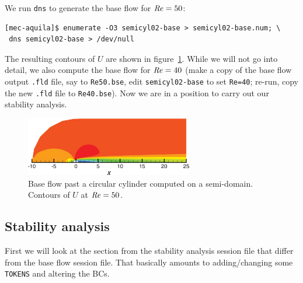 \documentclass[11pt,a4paper]{report}
\newcommand\Rey{\mbox{\textit{Re}}}
\begin{document}
We run \verb+dns+ to generate the base flow for $\Rey=50$:
\begin{verbatim}
[mec-aquila]$ enumerate -O3 semicyl02-base > semicyl02-base.num; \
 dns semicyl02-base > /dev/null
\end{verbatim}
\noindent
The resulting contours of $U$ are shown in figure~\ref{fig.semibase}.
While we will not go into detail, we also compute the base flow for
$\Rey=40$ (make a copy of the base flow output \verb+.fld+ file, say
to \verb+Re50.bse+, edit \verb+semicyl02-base+ to set \verb+Re=40+;
re-run, copy the new \verb+.fld+ file to \verb+Re40.bse+).  Now we are
in a position to carry out our stability analysis.
\begin{figure}
\begin{center}
\includegraphics[width=0.65\textwidth]{Re50_base_u.pdf}
\end{center}
\caption{Base flow past a circular cylinder computed on a
  semi-domain. Contours of $U$ at $\Rey=50$.}
\label{fig.semibase}
\end{figure}


\subsection{Stability analysis}

First we will look at the section from the stability analysis session
file that differ from the base flow session file. That basically
amounts to adding/changing some \verb+TOKENS+ and altering the BCs.
\end{document}
